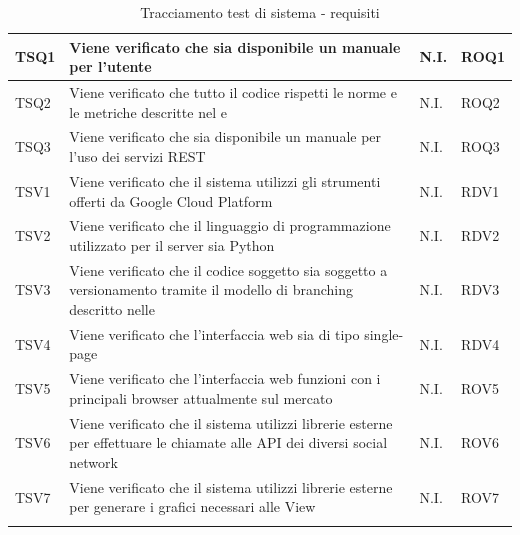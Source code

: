\begin{center}
\begin{longtable}{| p{2cm} | p{7.5cm} | p{1.5cm} | p{2cm} |}
					\hline
					TSQ1 & Viene verificato che sia disponibile un manuale per l'utente & N.I. & ROQ1\\
					\hline
					TSQ2 & Viene verificato che tutto il codice rispetti le norme e le metriche descritte nel \docNameVersionPdQ{} e \docNameVersionNdP & N.I. & ROQ2\\
					\hline
					TSQ3 & Viene verificato che sia disponibile un manuale per l'uso dei servizi REST & N.I. & ROQ3\\
					\hline
					TSV1 & Viene verificato che il sistema utilizzi gli strumenti offerti da Google Cloud Platform & N.I. & RDV1\\
					\hline
					TSV2 & Viene verificato che il linguaggio di programmazione utilizzato per il server sia Python & N.I. & RDV2\\
					\hline
					TSV3 & Viene verificato che il codice soggetto sia soggetto a versionamento tramite il modello di branching descritto nelle \docNameVersionNdP & N.I. & RDV3\\
					\hline
					TSV4 & Viene verificato che l'interfaccia web sia di tipo single-page & N.I. & RDV4\\
					\hline
					TSV5 & Viene verificato che l'interfaccia web funzioni con i principali browser attualmente sul mercato& N.I. & ROV5\\
					\hline
					TSV6 & Viene verificato che il sistema utilizzi librerie esterne per effettuare le chiamate alle API dei diversi social network & N.I. & ROV6\\
					\hline
					TSV7 & Viene verificato che il sistema utilizzi librerie esterne per generare i grafici necessari alle View & N.I. & ROV7\\
					\hline
			\caption{Tracciamento test di sistema - requisiti}
			\end{longtable}
				\egroup
\end{center}
		
